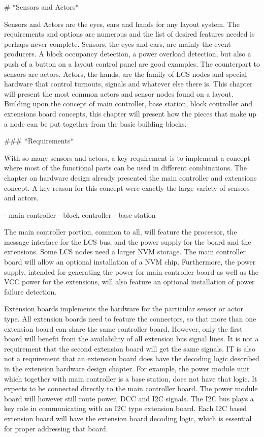 # *Sensors and Actors*

Sensors and Actors are the eyes, ears and hands for any layout system. The requirements and options are numerous and the list of desired features needed is perhaps never complete. Sensors, the eyes and ears, are mainly the event producers. A block occupancy detection, a power overload detection, but also a push of a button on a layout control panel are good examples. The counterpart to sensors  are actors. Actors, the hands, are the family of LCS nodes and special hardware that control turnouts, signals and whatever else there is. This chapter will present the most common actors and sensor nodes found on a layout. Building upon the concept of main controller, base station, block controller and extensions board concepts, this chapter will present how the pieces that make up a node can be put together from the basic building blocks.

### *Requirements*

With so many sensors and actors, a key requirement is to implement a concept where most of the functional parts can be used in different combinations. The chapter on hardware design already presented the main controller and extensions concept. A key reason for this concept were exactly the large variety of sensors and actors.

- main controller
- block controller
- base station

The main controller portion, common to all, will feature the processor, the message interface for the LCS bus, and the power supply for the board and the extensions. Some LCS nodes need a larger NVM storage. The main controller board will allow an optional installation of a NVM chip. Furthermore, the power supply, intended for generating the power for main controller board as well as the VCC power for the extensions, will also feature an optional installation of power failure detection.

Extension boards implements the hardware for the particular sensor or actor type. All extension boards need to feature the connectors, so that more than one extension board can share the same controller board. However, only the first board will benefit from the availability of all extension bus signal lines. It is not a requirement that the second extension board will get the same signals. IT is also not a requirement that an extension board does have the decoding logic described in the extension hardware design chapter. For example, the power module unit which together with main controller is a base station, does not have that logic. It expects to be connected directly to the main controller board. The power module board will however still route power, DCC and I2C signals. The I2C bus plays a key role in communicating with an I2C type extension board. Each I2C based extension board will have the extension board decoding logic, which is essential for proper addressing that board.


